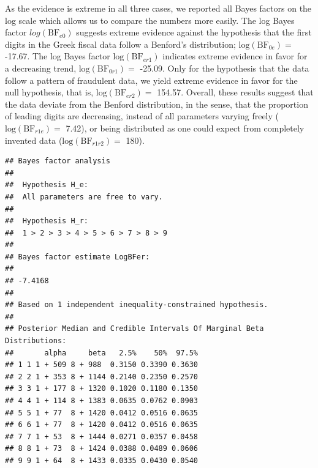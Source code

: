 \documentclass[
  english,
  man,floatsintext]{apa6}
\begin{document}
As the evidence is extreme in all three cases, we reported all Bayes factors on the log scale which allows us to compare the numbers more easily. The log Bayes factor \(log(\text{BF}_{e0})\) suggests extreme evidence against the hypothesis that the first digits in the Greek fiscal data follow a Benford's distribution; \(\text{log}(\text{BF}_{0e}) =\) -17.67. The log Bayes factor \(\text{log}(\text{BF}_{er1})\) indicates extreme evidence in favor for a decreasing trend, \(\text{log}(\text{BF}_{0r1}) =\) -25.09. Only for the hypothesis that the data follow a pattern of fraudulent data, we yield extreme evidence in favor for the null hypothesis, that is, \(\text{log}(\text{BF}_{er2}) =\) 154.57. Overall, these results suggest that the data deviate from the Benford distribution, in the sense, that the proportion of leading digits are decreasing, instead of all parameters varying freely (\(\text{log}(\text{BF}_{r1e}) =\) 7.42), or being distributed as one could expect from completely invented data (\(\text{log}(\text{BF}_{r1r2}) =\) 180).



\begin{verbatim}
## Bayes factor analysis
## 
##  Hypothesis H_e:
##  All parameters are free to vary.
## 
##  Hypothesis H_r:
##  1 > 2 > 3 > 4 > 5 > 6 > 7 > 8 > 9 
## 
## Bayes factor estimate LogBFer:
## 
## -7.4168
## 
## Based on 1 independent inequality-constrained hypothesis.
## 
## Posterior Median and Credible Intervals Of Marginal Beta Distributions:
##       alpha     beta   2.5%    50%  97.5%
## 1 1 1 + 509 8 + 988  0.3150 0.3390 0.3630
## 2 2 1 + 353 8 + 1144 0.2140 0.2350 0.2570
## 3 3 1 + 177 8 + 1320 0.1020 0.1180 0.1350
## 4 4 1 + 114 8 + 1383 0.0635 0.0762 0.0903
## 5 5 1 + 77  8 + 1420 0.0412 0.0516 0.0635
## 6 6 1 + 77  8 + 1420 0.0412 0.0516 0.0635
## 7 7 1 + 53  8 + 1444 0.0271 0.0357 0.0458
## 8 8 1 + 73  8 + 1424 0.0388 0.0489 0.0606
## 9 9 1 + 64  8 + 1433 0.0335 0.0430 0.0540
\end{verbatim}
\end{document}
